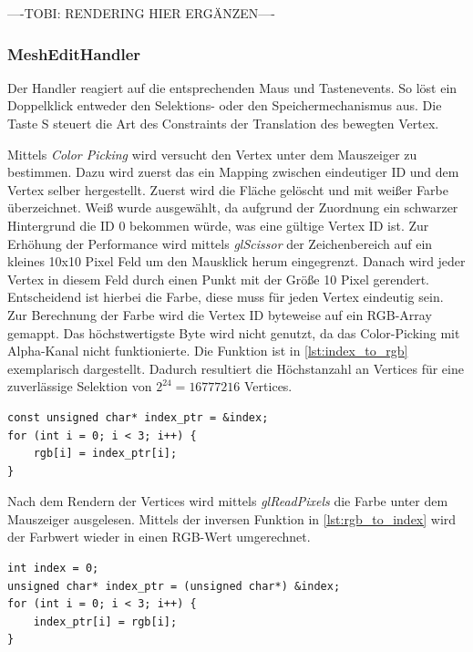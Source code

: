 ----TOBI: RENDERING HIER ERGÄNZEN----


\subsubsection{MeshEditHandler}

Der Handler reagiert auf die entsprechenden Maus und Tastenevents.
So löst ein Doppelklick entweder den Selektions- oder den Speichermechanismus aus.
Die Taste S steuert die Art des Constraints der Translation des bewegten Vertex.

Mittels \emph{Color Picking} wird versucht den Vertex unter dem Mauszeiger zu bestimmen.
Dazu wird zuerst das ein Mapping zwischen eindeutiger ID und dem Vertex selber hergestellt.
Zuerst wird die Fläche gelöscht und mit weißer Farbe überzeichnet.
Weiß wurde ausgewählt, da aufgrund der Zuordnung ein schwarzer Hintergrund die ID 0 bekommen würde, was eine gültige Vertex ID ist.
Zur Erhöhung der Performance wird mittels \emph{glScissor} der Zeichenbereich auf ein kleines 10x10 Pixel Feld um den Mausklick herum eingegrenzt.
Danach wird jeder Vertex in diesem Feld durch einen Punkt mit der Größe 10 Pixel gerendert.
Entscheidend ist hierbei die Farbe, diese muss für jeden Vertex eindeutig sein.
Zur Berechnung der Farbe wird die Vertex ID byteweise auf ein RGB-Array gemappt.
Das höchstwertigste Byte wird nicht genutzt, da das Color-Picking mit Alpha-Kanal nicht funktionierte.
Die Funktion ist in \autoref{lst:index_to_rgb} exemplarisch dargestellt.
Dadurch resultiert die Höchstanzahl an Vertices für eine zuverlässige Selektion von $2^{24} = 16777216$ Vertices.

\begin{lstlisting}[style=myCppStyle, caption={Umrechnung Index nach Farbwert}, label=lst:index_to_rgb]
const unsigned char* index_ptr = &index;
for (int i = 0; i < 3; i++) {
	rgb[i] = index_ptr[i];
}
\end{lstlisting}

Nach dem Rendern der Vertices wird mittels \emph{glReadPixels} die Farbe unter dem Mauszeiger ausgelesen.
Mittels der inversen Funktion in \autoref{lst:rgb_to_index} wird der Farbwert wieder in einen RGB-Wert umgerechnet.

\begin{lstlisting}[style=myCppStyle, caption={Inverse Funktion Farbwert nach Index}, label=lst:rgb_to_index]
int index = 0;
unsigned char* index_ptr = (unsigned char*) &index;
for (int i = 0; i < 3; i++) {
	index_ptr[i] = rgb[i];
}
\end{lstlisting}

